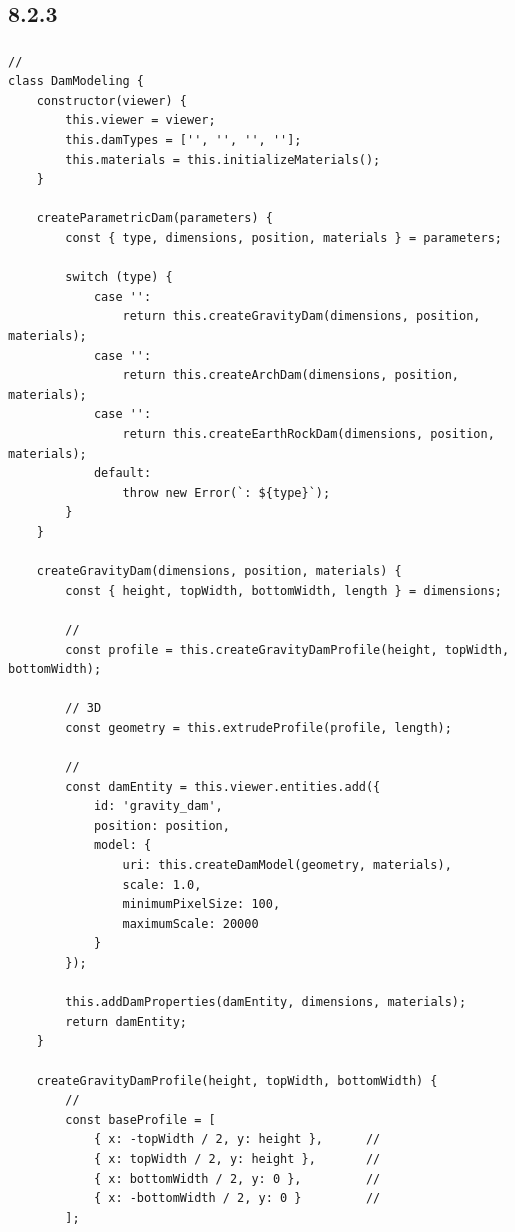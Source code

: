 \subsection{8.2.3}\label{section-25}

\subsubsection{}\label{section-26}

\paragraph{}\label{section-27}

\begin{verbatim}
// 
class DamModeling {
    constructor(viewer) {
        this.viewer = viewer;
        this.damTypes = ['', '', '', ''];
        this.materials = this.initializeMaterials();
    }
    
    createParametricDam(parameters) {
        const { type, dimensions, position, materials } = parameters;
        
        switch (type) {
            case '':
                return this.createGravityDam(dimensions, position, materials);
            case '':
                return this.createArchDam(dimensions, position, materials);
            case '':
                return this.createEarthRockDam(dimensions, position, materials);
            default:
                throw new Error(`: ${type}`);
        }
    }
    
    createGravityDam(dimensions, position, materials) {
        const { height, topWidth, bottomWidth, length } = dimensions;
        
        // 
        const profile = this.createGravityDamProfile(height, topWidth, bottomWidth);
        
        // 3D
        const geometry = this.extrudeProfile(profile, length);
        
        // 
        const damEntity = this.viewer.entities.add({
            id: 'gravity_dam',
            position: position,
            model: {
                uri: this.createDamModel(geometry, materials),
                scale: 1.0,
                minimumPixelSize: 100,
                maximumScale: 20000
            }
        });
        
        this.addDamProperties(damEntity, dimensions, materials);
        return damEntity;
    }
    
    createGravityDamProfile(height, topWidth, bottomWidth) {
        // 
        const baseProfile = [
            { x: -topWidth / 2, y: height },      // 
            { x: topWidth / 2, y: height },       //   
            { x: bottomWidth / 2, y: 0 },         // 
            { x: -bottomWidth / 2, y: 0 }         // 
        ];
        

\end{verbatim}
